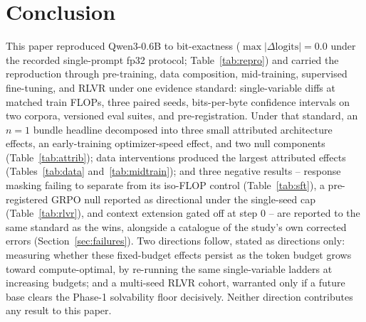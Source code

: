 \section{Conclusion}\label{sec:conclusion}

This paper reproduced Qwen3-0.6B to bit-exactness
($\max|\Delta\text{logits}| = 0.0$ under the recorded single-prompt fp32
protocol; Table~\ref{tab:repro}) and carried the reproduction through
pre-training, data composition, mid-training, supervised fine-tuning, and
RLVR under one evidence standard: single-variable diffs at matched train
FLOPs, three paired seeds, bits-per-byte confidence intervals on two
corpora, versioned eval suites, and pre-registration. Under that standard,
an $n{=}1$ bundle headline decomposed into three small attributed
architecture effects, an early-training optimizer-speed effect, and two
null components (Table~\ref{tab:attrib}); data interventions produced the
largest attributed effects (Tables~\ref{tab:data} and~\ref{tab:midtrain});
and three negative results -- response masking failing to separate from
its iso-FLOP control (Table~\ref{tab:sft}), a pre-registered GRPO null
reported as directional under the single-seed cap (Table~\ref{tab:rlvr}),
and context extension gated off at step 0 -- are reported to the same
standard as the wins, alongside a catalogue of the study's own corrected
errors (Section~\ref{sec:failures}). Two directions follow, stated as
directions only: measuring whether these fixed-budget effects persist as
the token budget grows toward compute-optimal, by re-running the same
single-variable ladders at increasing budgets; and a multi-seed RLVR
cohort, warranted only if a future base clears the Phase-1 solvability
floor decisively. Neither direction contributes any result to this paper.
